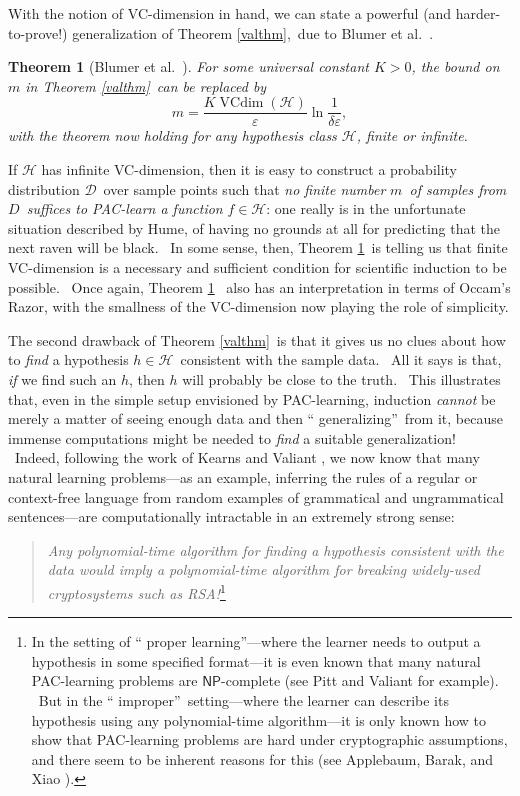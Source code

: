 \documentclass[12pt,onecolumn]{article}%
\newtheorem{theorem}{Theorem}
\begin{document}
With the notion of VC-dimension in hand, we can state a powerful (and
harder-to-prove!) generalization of Theorem \ref{valthm},\ due to Blumer et
al.\ \cite{behw}.

\begin{theorem}
[Blumer et al.\ \cite{behw}]\label{vcthm}For some universal constant $K>0$,
the bound on $m$ in Theorem \ref{valthm}\ can be replaced by%
\[
m=\frac{K\operatorname*{VCdim}\left(  \mathcal{H}\right)  }{\varepsilon}%
\ln\frac{1}{\delta\varepsilon},
\]
with the theorem now holding for any hypothesis class $\mathcal{H}$, finite or infinite.
\end{theorem}

If $\mathcal{H}$ has infinite VC-dimension, then it is easy to construct a
probability distribution $\mathcal{D}$\ over sample points such that
\textit{no finite number }$m$\textit{\ of samples from }$D$\textit{\ suffices
to PAC-learn a function} $f\in\mathcal{H}$: one really is in the unfortunate
situation described by Hume, of having no grounds at all for predicting that
the next raven will be black. \ In some sense, then, Theorem \ref{vcthm}\ is
telling us that finite VC-dimension is a necessary and sufficient condition
for scientific induction to be possible. \ Once again, Theorem \ref{vcthm}%
\ also has an interpretation in terms of Occam's Razor, with the smallness of
the VC-dimension now playing the role of simplicity.

The second drawback of Theorem \ref{valthm}\ is that it gives us no clues
about how to \textit{find} a hypothesis $h\in\mathcal{H}$\ consistent with the
sample data. \ All it says is that, \textit{if} we find such an $h$, then $h$
will probably be close to the truth. \ This illustrates that, even in the
simple setup envisioned by PAC-learning, induction \textit{cannot} be merely a
matter of seeing enough data and then \textquotedblleft
generalizing\textquotedblright\ from it, because immense computations might be
needed to \textit{find} a suitable generalization! \ Indeed, following the
work of Kearns and Valiant \cite{kv}, we now know that many natural learning
problems---as an example, inferring the rules of a regular or context-free
language from random examples of grammatical and ungrammatical sentences---are
computationally intractable in an extremely strong sense:

\begin{quotation}
\noindent\textit{Any polynomial-time algorithm for finding a hypothesis consistent with
the data would imply a polynomial-time algorithm for breaking widely-used
cryptosystems such as RSA!}\footnote{In the setting of \textquotedblleft
proper learning\textquotedblright---where the learner needs to output a
hypothesis in some specified format---it is even known that many natural
PAC-learning problems are $\mathsf{NP}$-complete (see Pitt and Valiant
\cite{pittvaliant} for example). \ But in the \textquotedblleft
improper\textquotedblright\ setting---where the learner can describe its
hypothesis using any polynomial-time algorithm---it is only known how to show
that PAC-learning problems are hard under cryptographic assumptions, and there
seem to be inherent reasons for this (see Applebaum, Barak, and Xiao
\cite{abx}).}
\end{quotation}
\end{document}
